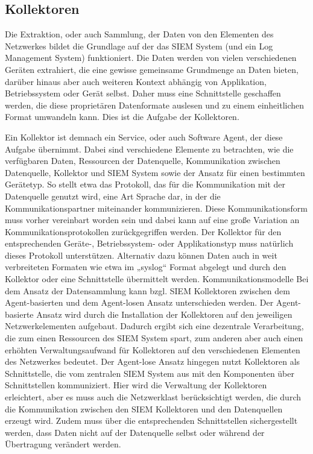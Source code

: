 \subsection{Kollektoren}
Die Extraktion, oder auch Sammlung, der Daten von den Elementen des Netzwerkes bildet die Grundlage auf der das SIEM System (und ein Log Management System) funktioniert. Die Daten werden von vielen verschiedenen Geräten extrahiert, die eine gewisse gemeinsame Grundmenge an Daten bieten, darüber hinaus aber auch weiteren Kontext abhängig von Applikation, Betriebssystem oder Gerät selbst. Daher muss eine Schnittstelle geschaffen werden, die diese proprietären Datenformate auslesen und zu einem einheitlichen Format umwandeln kann. Dies ist die Aufgabe der Kollektoren.

Ein Kollektor ist demnach ein Service, oder auch Software Agent, der diese Aufgabe übernimmt. Dabei sind verschiedene Elemente zu betrachten, wie die verfügbaren Daten, Ressourcen der Datenquelle, Kommunikation zwischen Datenquelle, Kollektor und SIEM System sowie der Ansatz für einen bestimmten Gerätetyp. So stellt etwa das Protokoll, das für die Kommunikation mit der Datenquelle genutzt wird, eine Art Sprache dar, in der die Kommunikationspartner miteinander kommunizieren. Diese Kommunikationsform muss vorher vereinbart worden sein und dabei kann auf eine große Variation an Kommunikationsprotokollen zurückgegriffen werden. Der Kollektor für den entsprechenden Geräte-, Betriebssystem- oder Applikationstyp muss natürlich dieses Protokoll unterstützen. Alternativ dazu können Daten auch in weit verbreiteten Formaten wie etwa im „syslog“ Format abgelegt und durch den Kollektor oder eine Schnittstelle übermittelt werden.
Kommunikationsmodelle
Bei dem Ansatz der Datensammlung kann bzgl. SIEM Kollektoren zwischen dem Agent-basierten und dem Agent-losen Ansatz unterschieden werden. Der Agent-basierte Ansatz wird durch die Installation der Kollektoren auf den jeweiligen Netzwerkelementen aufgebaut. Dadurch ergibt sich eine dezentrale Verarbeitung, die zum einen Ressourcen des SIEM System spart, zum anderen aber auch einen erhöhten Verwaltungsaufwand für Kollektoren auf den verschiedenen Elementen des Netzwerkes bedeutet. Der Agent-lose Ansatz hingegen nutzt Kollektoren als Schnittstelle, die vom zentralen SIEM System aus mit den Komponenten über Schnittstellen kommuniziert. Hier wird die Verwaltung der Kollektoren erleichtert, aber es muss auch die Netzwerklast berücksichtigt werden, die durch die Kommunikation zwischen den SIEM Kollektoren und den Datenquellen erzeugt wird. Zudem muss über die entsprechenden Schnittstellen sichergestellt werden, dass Daten nicht auf der Datenquelle selbst oder während der Übertragung verändert werden.


